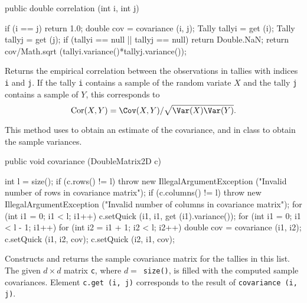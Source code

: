 \begin{code}

   public double correlation (int i, int j)\begin{hide} {
      if (i == j)
         return 1.0;
      double cov = covariance (i, j);
      Tally tallyi = get (i);
      Tally tallyj = get (j);
      if (tallyi == null || tallyj == null)
         return Double.NaN;
      return cov/Math.sqrt (tallyi.variance()*tallyj.variance());
   }\end{hide}
\end{code}
\begin{tabb}   Returns the empirical correlation between
 the observations in tallies with indices \texttt{i} and \texttt{j}.
 If the tally \texttt{i} contains a sample of the random
 variate $X$ and the tally \texttt{j} contains a sample of $Y$,
 this corresponds to
 \[\mathrm{Cor}(X, Y)=\Cov(X, Y)
 /\sqrt{\Var(X)\Var(Y)}.\]
 
 This method uses 
 to obtain an estimate of the covariance, and
  in
class  to obtain the sample variances.
\end{tabb}
\begin{htmlonly}
\end{htmlonly}
\begin{code}

   public void covariance (DoubleMatrix2D c)\begin{hide} {
      int l = size();
      if (c.rows() != l)
         throw new IllegalArgumentException
            ("Invalid number of rows in covariance matrix");
      if (c.columns() != l)
         throw new IllegalArgumentException
            ("Invalid number of columns in covariance matrix");
      for (int i1 = 0; i1 < l; i1++)
         c.setQuick (i1, i1, get (i1).variance());
      for (int i1 = 0; i1 < l - 1; i1++)
         for (int i2 = i1 + 1; i2 < l; i2++) {
            double cov = covariance (i1, i2);
            c.setQuick (i1, i2, cov);
            c.setQuick (i2, i1, cov);
         }
   }\end{hide}
\end{code}
\begin{tabb}   Constructs and returns the sample covariance matrix
 for the tallies in this list.  The given $d\times d$ matrix \texttt{c},
 where $d=$~\texttt{size()},
 is filled with the computed sample covariances.
 Element \texttt{c.get (i, j)} corresponds to
 the result of
 \texttt{covariance (i, j)}.
\end{tabb}
